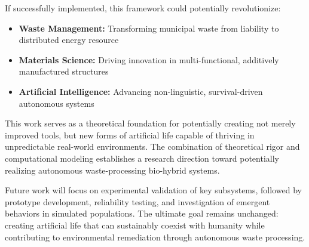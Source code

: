 If successfully implemented, this framework could potentially revolutionize:
\begin{itemize}
    \item \textbf{Waste Management:} Transforming municipal waste from liability to distributed energy resource
    \item \textbf{Materials Science:} Driving innovation in multi-functional, additively manufactured structures
    \item \textbf{Artificial Intelligence:} Advancing non-linguistic, survival-driven autonomous systems
\end{itemize}

This work serves as a theoretical foundation for potentially creating not merely improved tools, but new forms of artificial life capable of thriving in unpredictable real-world environments. The combination of theoretical rigor and computational modeling establishes a research direction toward potentially realizing autonomous waste-processing bio-hybrid systems.

Future work will focus on experimental validation of key subsystems, followed by prototype development, reliability testing, and investigation of emergent behaviors in simulated populations. The ultimate goal remains unchanged: creating artificial life that can sustainably coexist with humanity while contributing to environmental remediation through autonomous waste processing.
